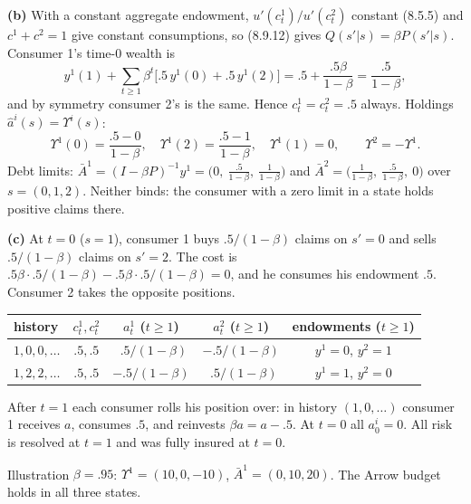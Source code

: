\documentclass[12pt, letterpaper]{article}
\begin{document}
\begin{tcolorbox}[oddbox,title={Exercise 8.13 \quad Early resolution of uncertainty}]
\textbf{(b)} With a constant aggregate endowment, $u'(c^1_t)/u'(c^2_t)$ constant (8.5.5) and $c^1+c^2=1$ give
constant consumptions, so (8.9.12) gives $Q(s'|s)=\beta P(s'|s)$. Consumer 1's time-0 wealth is
\[
y^1(1)+\sum_{t\ge1}\beta^t\big[.5\,y^1(0)+.5\,y^1(2)\big]=.5+\frac{.5\beta}{1-\beta}=\frac{.5}{1-\beta},
\]
and by symmetry consumer 2's is the same. Hence $c^1_t=c^2_t=.5$ always. Holdings $\hat a^i(s)=\Upsilon^i(s)$:
\[
\Upsilon^1(0)=\frac{.5-0}{1-\beta},\quad\Upsilon^1(2)=\frac{.5-1}{1-\beta},\quad\Upsilon^1(1)=0,\qquad\Upsilon^2=-\Upsilon^1 .
\]
Debt limits: $\bar A^1=(I-\beta P)^{-1}y^1=\big(0,\ \tfrac{.5}{1-\beta},\ \tfrac1{1-\beta}\big)$ and
$\bar A^2=\big(\tfrac1{1-\beta},\ \tfrac{.5}{1-\beta},\ 0\big)$ over $s=(0,1,2)$. Neither binds: the consumer with
a zero limit in a state holds positive claims there.

\textbf{(c)} At $t=0$ ($s=1$), consumer 1 buys $.5/(1-\beta)$ claims on $s'=0$ and sells $.5/(1-\beta)$ claims on $s'=2$.
The cost is $.5\beta\cdot.5/(1-\beta)-.5\beta\cdot.5/(1-\beta)=0$, and he consumes his endowment $.5$. Consumer 2 takes the
opposite positions.
\begin{center}
\begin{tabular}{@{}lcccc@{}}
\toprule
history & $c^1_t,c^2_t$ & $a^1_t$ ($t\ge1$) & $a^2_t$ ($t\ge1$) & endowments ($t\ge1$)\\
\midrule
$1,0,0,\dots$ & $.5,.5$ & $\ \ .5/(1-\beta)$ & $-.5/(1-\beta)$ & $y^1=0$, $y^2=1$\\
$1,2,2,\dots$ & $.5,.5$ & $-.5/(1-\beta)$ & $\ \ .5/(1-\beta)$ & $y^1=1$, $y^2=0$\\
\bottomrule
\end{tabular}
\end{center}
After $t=1$ each consumer rolls his position over: in history $(1,0,\dots)$ consumer 1 receives $a$, consumes $.5$,
and reinvests $\beta a=a-.5$. At $t=0$ all $a^i_0=0$. All risk is resolved at $t=1$ and was fully insured at
$t=0$.

\begin{tcolorbox}[databox]
Illustration $\beta=.95$: $\Upsilon^1=(10,0,-10)$, $\bar A^1=(0,10,20)$. The Arrow budget holds in all three states.
\end{tcolorbox}
\end{tcolorbox}
\end{document}
